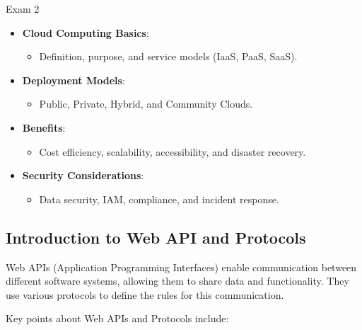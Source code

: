 \begin{examnotes}{Exam 2}
\begin{highlight}
        \begin{itemize}
            \item \textbf{Cloud Computing Basics}:
                \begin{itemize}
                    \item Definition, purpose, and service models (IaaS, PaaS, SaaS).
                \end{itemize}
            \item \textbf{Deployment Models}:
                \begin{itemize}
                    \item Public, Private, Hybrid, and Community Clouds.
                \end{itemize}
            \item \textbf{Benefits}:
                \begin{itemize}
                    \item Cost efficiency, scalability, accessibility, and disaster recovery.
                \end{itemize}
            \item \textbf{Security Considerations}:
                \begin{itemize}
                    \item Data security, IAM, compliance, and incident response.
                \end{itemize}
        \end{itemize}
    \end{highlight}

    \subsection*{Introduction to Web API and Protocols}

    Web APIs (Application Programming Interfaces) enable communication between different software systems, allowing them to share data and functionality. They use various protocols to define the rules for this communication.
    
    \begin{highlight}
        Key points about Web APIs and Protocols include:
        

\end{highlight}
\end{examnotes}
